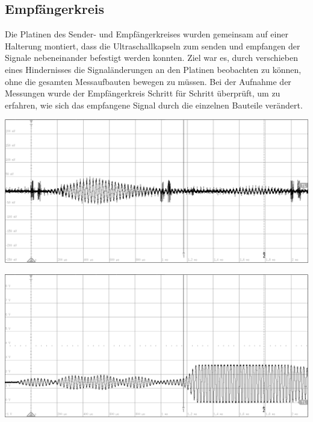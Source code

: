 \subsection{Empfängerkreis}
Die Platinen des Sender- und Empfängerkreises wurden gemeinsam auf einer Halterung montiert, dass die Ultraschallkapseln zum senden und empfangen der Signale nebeneinander befestigt werden konnten. Ziel war es, durch verschieben eines Hindernisses die Signaländerungen an den Platinen beobachten zu können, ohne die gesamten Messaufbauten bewegen zu müssen. Bei der Aufnahme der Messungen wurde der Empfängerkreis Schritt für Schritt überprüft, um zu erfahren, wie sich das empfangene Signal durch die einzelnen Bauteile verändert.\\
\begin{minipage}{0.46\textwidth}
\includegraphics[width=1\textwidth%
]{Abbildungen/MessungenP1/Signal-Empfang.png}
\label{fig:Empfang am LS}
\end{minipage}\qquad
\begin{minipage}{0.46\textwidth}
\includegraphics[width=1\textwidth%
]{Abbildungen/MessungenP1/Signal-nach-Verstarkung.png}
\label{fig:Verstaerkung}
\end{minipage}\\
